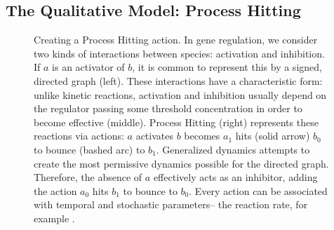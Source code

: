 \documentclass{article}
\begin{document}
\subsection{The Qualitative Model: Process Hitting}\label{process_hitting}
\begin{figure}

\begin{subfigure}[t]{0.3\textwidth}
\end{subfigure}
\begin{subfigure}[b]{0.35\textwidth}
  \end{subfigure}
\begin{subfigure}[b]{0.33\textwidth}
\end{subfigure}

\caption{Creating a Process Hitting action. In gene regulation, we consider two kinds of interactions between species: activation and inhibition. If $a$ is an activator of $b$, it is common to represent this by a signed, directed graph (left). These interactions have a characteristic form: unlike kinetic reactions, activation and inhibition usually depend on the regulator passing some threshold concentration in order to become effective (middle). Process Hitting (right) represents these reactions via actions: $a$ activates $b$ becomes $a_1$ hits (solid arrow) $b_0$ to bounce (bashed arc) to $b_1$.  Generalized dynamics attempts to create the most permissive dynamics possible for the directed graph. Therefore, the absence of $a$ effectively acts as an inhibitor, adding the action $a_0$ hits $b_1$ to bounce to $b_0$. Every action can be associated with temporal and stochastic parameters-- the reaction rate, for example \cite{pauleve2011tuning}.}
\label{PH_fig}

\end{figure}
\end{document}
